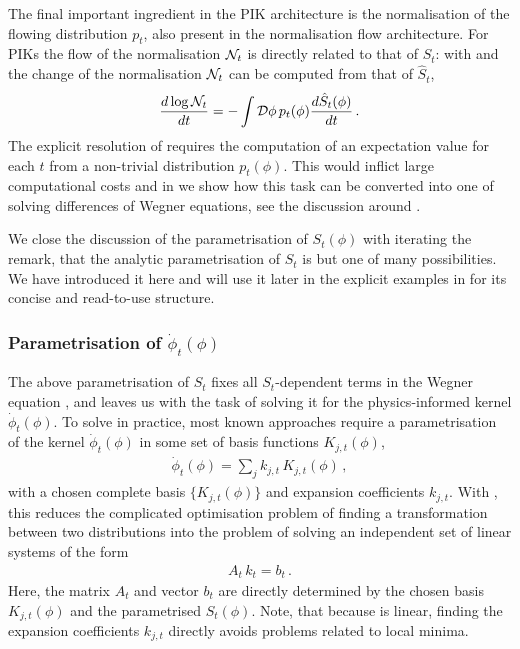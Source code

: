 \documentclass[reprint,amsmath,amssymb,aps,pra,superscriptaddress,nofootinbib,twocolumn,floatfix,nolongbibliography]{revtex4-2}
\begin{document}
The final important ingredient in the PIK architecture is the normalisation of the flowing distribution $p_t$, also present in the normalisation flow architecture. For PIKs the flow of the normalisation ${\cal N}_t$ is directly related to that of $S_t$: with  and  the change of the normalisation ${\cal N}_t$ can be computed from that of $\hat S_t$, 
%
\begin{align}
    \frac{d \log {\cal N}_t}{dt} =  - \int {\cal D} \phi\,p_t(\phi) \frac{d\hat{S}_t(\phi)}{dt} \,.
    \label{eq:ChangeInPartitionSum}
\end{align}
%
The explicit resolution of  requires the computation of an expectation value for each 
$t$ from a non-trivial distribution $p_t(\phi)$. This would inflict large computational costs and in  we show how this task can be converted into one of solving differences of Wegner equations, see the discussion around . 

We close the discussion of the parametrisation of $S_t(\phi)$ with iterating the remark, that the analytic parametrisation of $S_t$ is but one of many possibilities. We have introduced it here and will use it later in the explicit examples in  for its concise and read-to-use structure. 


\subsubsection{Parametrisation of $\dot{\phi}_t(\phi)$}
\label{sec:GenParadotphi}

The above parametrisation of $S_t$ fixes all $S_t$-dependent terms in the Wegner equation , and leaves us with the task of solving it for the physics-informed kernel $\dot{\phi}_t(\phi)$. To solve  in practice, most known approaches require a parametrisation of the kernel $\dot{\phi}_t(\phi)$ in some set of basis functions $K_{j,t}(\phi)$, 
%
\begin{align}
    \dot{\phi}_t(\phi) = \sum_j k_{j, t} \, K_{j,t}(\phi)\,,
    \label{eq:KernelParametrization}
\end{align}
with a chosen complete basis $\{K_{j,t}(\phi)\}$ and expansion coefficients $k_{j, t}$. With , this reduces the complicated optimisation problem of finding a transformation between two distributions into the problem of solving an independent set of linear systems of the form
%
\begin{align}
    A_t\, k_t = b_t\,.
    \label{eq:LinearSystem}
\end{align}
%
Here, the matrix $A_t$ and vector $b_t$ are directly determined by the chosen basis $K_{j,t}(\phi)$ and the parametrised $S_t(\phi)$. Note, that because  is linear, finding the expansion coefficients $k_{j,t}$ directly avoids problems related to local minima. 
\end{document}
